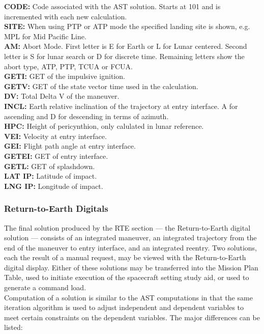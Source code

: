 \documentclass[11pt]{article} %
\begin{document}
\textbf{CODE:} Code associated with the AST solution. Starts at 101 and is incremented with each new calculation.\\
\textbf{SITE:} When using PTP or ATP mode the specified landing site is shown, e.g. MPL for Mid Pacific Line.\\
\textbf{AM:} Abort Mode. First letter is E for Earth or L for Lunar centered. Second letter is S for lunar search or D for discrete time. Remaining letters show the abort type, ATP, PTP, TCUA or FCUA.\\
\textbf{GETI:} GET of the impulsive ignition.\\
\textbf{GETV:} GET of the state vector time used in the calculation.\\
\textbf{DV:} Total Delta V of the maneuver.\\
\textbf{INCL:} Earth relative inclination of the trajectory at entry interface. A for ascending and D for descending in terms of azimuth.\\
\textbf{HPC:} Height of pericynthion, only calulated in lunar reference.\\
\textbf{VEI:} Velocity at entry interface.\\
\textbf{GEI:} Flight path angle at entry interface.\\
\textbf{GETEI:} GET of entry interface.\\
\textbf{GETL:} GET of splashdown.\\
\textbf{LAT IP:} Latitude of impact.\\
\textbf{LNG IP:} Longitude of impact.\\

\subsubsection{Return-to-Earth Digitals}

The final solution produced by the RTE section — the Return-to-Earth digital solution — consists of an integrated maneuver, an integrated trajectory from the
end of the maneuver to entry interface, and an integrated reentry. Two solutions, each the result of a manual request, may be viewed with the Return-to-Earth
digital display. Either of these solutions may be transferred into the Mission Plan Table, used to initiate execution of the spacecraft setting study aid, or used to generate a command load.\\
Computation of a solution is similar to the AST computations in that the same iteration algorithm is used to adjust independent and dependent variables to meet
certain constraints on the dependent variables. The major differences can be listed:
\end{document}
